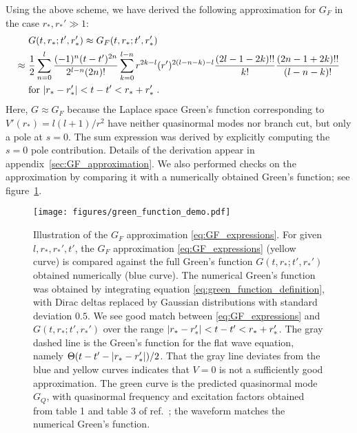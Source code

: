 \documentclass[reprint,aps,physrev,superscriptaddress,10pt,notitlepage,prd,nofootinbib,onecolumn]{revtex4-2}
\newcommand{\fref}[1]{figure~\ref{#1}}
\newcommand{\aref}[1]{appendix~\ref{#1}}
\begin{document}
Using the above scheme, we have derived the following approximation for $G_F$ in the case $r_*, r_*' \gg 1$:
\begin{align}
  \label{eq:GF_expressions}
  & \ G(t,r_*;t',r_*') \approx G_F(t,r_*;t',r_*')  \nonumber \\
\approx & \ \frac12 \sum_{n=0}^{l} \frac{(-1)^n (t-t')^{2n}}{2^{l-n} (2n)!}
  \sum_{k=0}^{l-n} r^{2k - l} (r')^{2(l-n-k) - l} \frac{ (2l-1-2k)!! }{k!}
          \frac{ (2n-1+2k)!! }{(l-n-k)!} \nonumber \\
  & \ \textrm{for } \abs{r_* - r_*'} < t-t' < r_* + r_*'\;.
\end{align}
Here, $G \approx G_F$ because the Laplace space Green's function corresponding to $V'(r_*) = l(l+1)/r^2$ have neither quasinormal modes nor branch cut, but only a pole at $s=0$.
The sum expression was derived by explicitly computing the $s=0$ pole contribution.
Details of the derivation appear in \aref{sec:GF_approximation}.
We also performed checks on the approximation by comparing it with a numerically obtained Green's function; see \fref{fig:green_function_demo}.


\begin{figure}
  \centering
  \texttt{[image: figures/green\_function\_demo.pdf]}
  \caption{
    Illustration of the $G_F$ approximation \eqref{eq:GF_expressions}.
    For given $l,r_*,r_*',t'$, the $G_F$ approximation \eqref{eq:GF_expressions} (yellow curve) is compared against the full Green's function $G(t,r_*;t',r_*')$ obtained numerically (blue curve).
    The numerical Green's function was obtained by integrating equation \eqref{eq:green_function_definition}, with Dirac deltas replaced by Gaussian distributions with standard deviation $0.5$.
    We see good match between \eqref{eq:GF_expressions} and $G(t,r_*;t',r_*')$ over the range $\abs{r_*-r_*'} < t-t' < r_* + r_*'$.
    The gray dashed line is the Green's function for the flat wave equation, namely $\Theta(t-t'-\abs{r_*-r_*'}) / 2$.
    That the gray line deviates from the blue and yellow curves indicates that $V=0$ is not a sufficiently good approximation.
    The green curve is the predicted quasinormal mode $G_Q$, with quasinormal frequency and excitation factors obtained from table 1 and table 3 of ref.~\cite{Berti:2006wq}; the waveform matches the numerical Green's function.
  }
  \label{fig:green_function_demo}
\end{figure}
\end{document}
